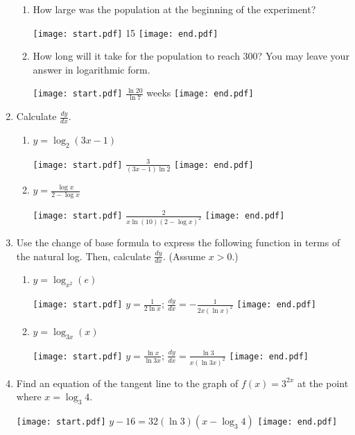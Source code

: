 \documentclass[12pt]{article}
\begin{document}
\begin{enumerate}
\begin{enumerate}

\item How large was the population at the beginning of the experiment?

\texttt{[image: start.pdf]}
{15}
\texttt{[image: end.pdf]}


\item How long will it take for the population to reach 300?  You may leave your answer in logarithmic form.

\texttt{[image: start.pdf]}
{$\displaystyle \frac{\ln{20}}{\ln{7}}$ weeks}
\texttt{[image: end.pdf]}


\end{enumerate}

\item Calculate $\frac{dy}{dx}$.

\begin{enumerate}

\item $y = \log_{2}{(3x-1)}$ 

\texttt{[image: start.pdf]}
{{$\frac{3}{(3x-1)\ln2}$}}
\texttt{[image: end.pdf]}


\item $y=\frac{\log{x}}{2-\log{x}}$

\texttt{[image: start.pdf]}
{{$\frac{2}{x\ln{(10)}(2-\log{x})^2}$}}
\texttt{[image: end.pdf]}


\end{enumerate}

\item Use the change of base formula to express the following function in terms of the natural log.  Then, calculate $\frac{dy}{dx}$.  (Assume $x>0$.)

\begin{enumerate}

\item $y=\log_{x^2}{(e)}$

\texttt{[image: start.pdf]}
{{$y=\frac{1}{2\ln{x}}$; $\frac{dy}{dx}=-\frac{1}{2x(\ln{x})^2}$}}
\texttt{[image: end.pdf]}


\item $y = \log_{3x}{(x)}$ 

\texttt{[image: start.pdf]}
{{$y=\frac{\ln{x}}{\ln{3x}} $; $\frac{dy}{dx}=\frac{\ln{3}}{x(\ln{3x})^2}$}}
\texttt{[image: end.pdf]}


\end{enumerate}

\item Find an equation of the tangent line to the graph of $f(x)=3^{2x}$ at the point where $x=\log_3{4}$.

\texttt{[image: start.pdf]}
{$y-16=32(\ln{3})(x-\log_{3}4)$}
\texttt{[image: end.pdf]}


\end{enumerate}
\end{document}
